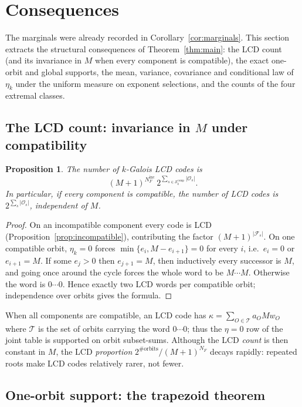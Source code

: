 \documentclass[11pt,a4paper]{article}
\newcommand{\Fs}{\mathcal F_s}
\newcommand{\Os}{\mathcal O_s}
\numberwithin{equation}{section}
\theoremstyle{plain}
\newtheorem{proposition}[theorem]{Proposition}
\theoremstyle{definition}
\theoremstyle{remark}
\begin{document}
\section{Consequences}\label{sec:consequences}

The marginals were already recorded in Corollary~\ref{cor:marginals}.  This
section extracts the structural consequences of Theorem~\ref{thm:main}: the
LCD count (and its invariance in $M$ when every component is compatible), the exact one-orbit and global supports,
the mean, variance, covariance and conditional law of $\eta_k$ under the
uniform measure on exponent selections, and the counts of the four extremal
classes.

\subsection{The LCD count: invariance in \texorpdfstring{$M$}{M} under compatibility}
\label{sec:lcd}

\begin{proposition}\label{prop:lcd-count}
The number of $k$-Galois LCD codes is
\[
(M+1)^{N_F^{\mathrm{inc}}}\,
2^{\sum_{s\in\mathcal{S}_k^{\mathrm{comp}}}|\Os|}.
\]
In particular, if every component is compatible, the number of LCD codes is
$2^{\sum_s|\Os|}$, independent of $M$.
\end{proposition}

\begin{proof}
On an incompatible component every code is LCD
(Proposition~\ref{prop:incompatible}), contributing the factor
$(M+1)^{|\Fs|}$.  On one compatible orbit, $\eta_k=0$ forces
$\min\{e_i,M-e_{i+1}\}=0$ for every $i$, i.e.\ $e_i=0$ or $e_{i+1}=M$.
If some $e_j>0$ then $e_{j+1}=M$, then inductively every successor is $M$, and
going once around the cycle forces the whole word to be $M\cdots M$.
Otherwise the word is $0\cdots0$.  Hence exactly two LCD words per compatible
orbit; independence over orbits gives the formula.
\end{proof}

When all components are compatible, an LCD code has
$\kappa=\sum_{O\in\mathcal{T}}a_OMw_O$ where $\mathcal{T}$ is the set of orbits
carrying the word $0\cdots0$; thus the $\eta=0$ row of the joint table is
supported on orbit subset-sums.  Although the LCD \emph{count} is then constant
in $M$, the LCD \emph{proportion} $2^{\#\mathrm{orbits}}/(M+1)^{N_F}$ decays
rapidly: repeated roots make LCD codes relatively rarer, not fewer.

\subsection{One-orbit support: the trapezoid theorem}\label{sec:support}
\end{document}
